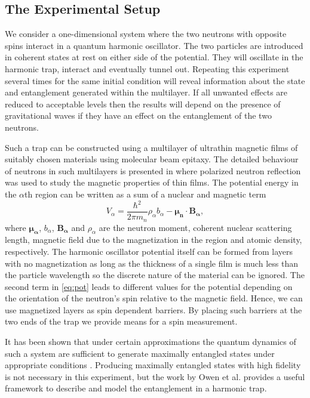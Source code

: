 \subsection{The Experimental Setup}

We consider a one-dimensional system where the two neutrons with
opposite spins interact in a quantum harmonic oscillator. The two
particles are introduced in coherent states at rest on either side of
the potential. They will oscillate in the harmonic trap, interact and
eventually tunnel out. Repeating this experiment several times for the
same initial condition will reveal information about the state and
entanglement generated within the multilayer. If all unwanted effects
are reduced to acceptable levels then the results will depend on the
presence of gravitational waves if they have an effect on the
entanglement of the two neutrons.

Such a trap can be constructed using a multilayer of ultrathin
magnetic films of suitably chosen materials using molecular beam
epitaxy. The detailed behaviour of neutrons in such multilayers is
presented in \cite{blundell} where polarized neutron reflection was
used to study the magnetic properties of thin films. The potential
energy in the $\alpha$th region can be written as a sum of a nuclear
and magnetic term
\begin{equation}\label{eq:pot}
V_\alpha = \frac{\hbar^2}{2\pi m_n}\rho_\alpha b_\alpha -
\boldsymbol{\mu_n}\cdot\boldsymbol{B_\alpha},
\end{equation}
where $\boldsymbol{\mu_\alpha}$, $b_\alpha$, $\boldsymbol{B_\alpha}$
and $\rho_\alpha$ are the neutron moment, coherent nuclear scattering
length, magnetic field due to the magnetization in the region and
atomic density, respectively. The harmonic oscillator potential itself
can be formed from layers with no magnetization as long as the
thickness of a single film is much less than the particle wavelength
so the discrete nature of the material can be ignored. The second term
in \eqref{eq:pot} leads to different values for the potential
depending on the orientation of the neutron's spin relative to the
magnetic field. Hence, we can use magnetized layers as spin dependent
barriers. By placing such barriers at the two ends of the trap we
provide means for a spin measurement.

It has been shown that under certain approximations the quantum
dynamics of such a system are sufficient to generate maximally
entangled states under appropriate conditions \cite{edmund}. Producing
maximally entangled states with high fidelity is not necessary in this
experiment, but the work by Owen et al. provides a useful framework to
describe and model the entanglement in a harmonic trap.

